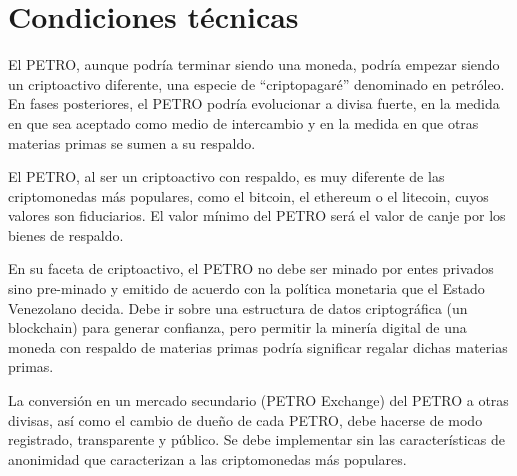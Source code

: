 %
\section{Condiciones técnicas}
\label{sec:annexa}
%
El PETRO, aunque podría terminar siendo una moneda, podría empezar siendo un criptoactivo diferente, una especie de ``criptopagaré'' denominado en petróleo. En fases posteriores, el PETRO podría evolucionar a divisa fuerte, en la medida en que sea aceptado como medio de intercambio y en la medida en que otras materias primas se sumen a su respaldo.

El PETRO, al ser un criptoactivo con respaldo, es muy diferente de las criptomonedas más populares, como el bitcoin, el ethereum o el litecoin, cuyos valores son fiduciarios. El valor mínimo del PETRO será el valor de canje por los bienes de respaldo. 

En su faceta de criptoactivo, el PETRO no debe ser minado por entes privados sino pre-minado y emitido de acuerdo con la política monetaria que el Estado Venezolano decida. Debe ir sobre una estructura de datos criptográfica (un blockchain) para generar confianza, pero permitir la minería digital de una moneda con respaldo de materias primas podría significar regalar dichas materias primas. 

La conversión en un mercado secundario (PETRO Exchange) del PETRO a otras divisas, así como el cambio de dueño de cada PETRO, debe hacerse de modo registrado, transparente y público. Se debe implementar sin las características de anonimidad que caracterizan a las criptomonedas más populares.

